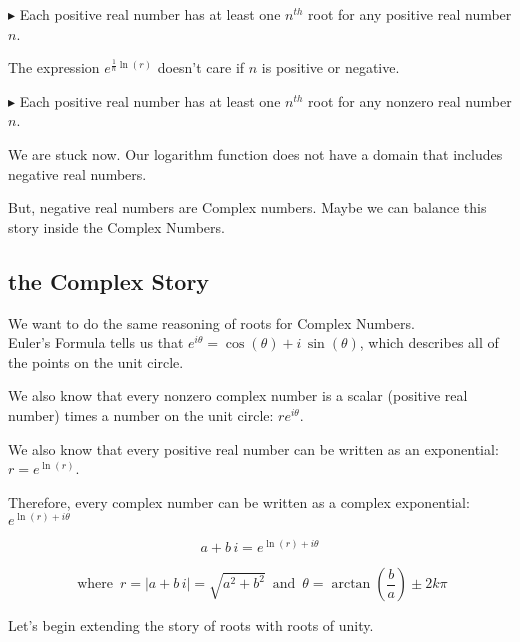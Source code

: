 \documentclass{ximera}
\begin{document}
$\blacktriangleright$ Each positive real number has at least one $n^{th}$ root for any positive real number $n$.


The expression $e^{\tfrac{1}{n} \ln(r)}$ doesn't care if $n$ is positive or negative.




$\blacktriangleright$ Each positive real number has at least one $n^{th}$ root for any nonzero real number $n$.



We are stuck now.  Our logarithm function does not have a domain that includes negative real numbers.

But, negative real numbers are Complex numbers.  Maybe we can balance this story inside the Complex Numbers. \\












\subsection{the Complex Story}






We want to do the same reasoning of roots for Complex Numbers. \\


Euler's Formula tells us that $e^{i \theta} = \cos(\theta) + i \, \sin(\theta)$, which describes all of the points on the unit circle.

We also know that every nonzero complex number is a scalar (positive real number) times a number on the unit circle:  $r e^{i \theta}$.

We also know that every positive real number can be written as an exponential: $r = e^{\ln(r)}$.

Therefore, every complex number can be written as a complex exponential: $ e^{\ln(r) + i \theta}$


\[   a + b \, i =    e^{\ln(r) + i \theta}   \]

\[   \text{ where } \,   r = |a + b \, i| = \sqrt{a^2 + b^2}   \, \text{ and } \,   \theta = \arctan\left (\frac{b}{a} \right) \pm 2k\pi\]


Let's begin extending the story of roots with roots of unity.
\end{document}
